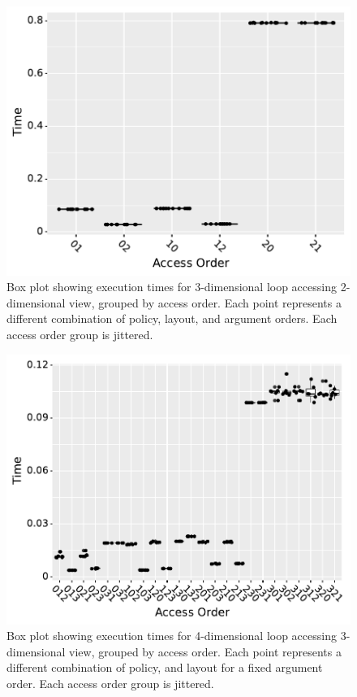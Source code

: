 \documentclass[sigconf]{acmart}
\begin{document}
\begin{figure}
	\includegraphics[width=\columnwidth]{benchmark2_boxplot.pdf}
	\caption{Box plot showing execution times for 3-dimensional loop accessing 2-dimensional view, grouped by access order. Each point represents a different combination of policy, layout, and argument orders. Each access order group is jittered.}
	\label{AccessBenchmark2}
\end{figure}

\begin{figure}
	\includegraphics[width=\columnwidth]{benchmark3_boxplot.pdf}
	\caption{Box plot showing execution times for 4-dimensional loop accessing 3-dimensional view, grouped by access order. Each point represents a different combination of policy, and layout for a fixed argument order. Each access order group is jittered.}
	\label{AccessBenchmark3}
\end{figure}
\end{document}
